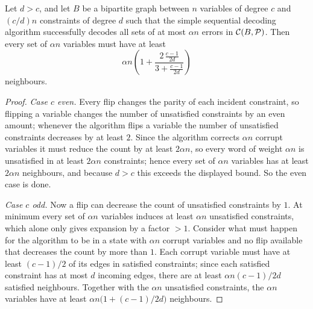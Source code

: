 \begin{theorem}
  \label{thm:necessity}
  Let $d>c$, and let $B$ be a bipartite graph between $n$ variables of degree
  $c$ and $(c/d)n$ constraints of degree $d$ such that the simple sequential
  decoding algorithm successfully decodes all sets of at most $\alpha n$ errors
  in $\mathcal{C}(B,\mathcal{P})$. Then every set of $\alpha n$ variables must have at least
  \[
    \alpha n\left(1 + \frac{2\,\frac{c-1}{2d}}{3+\frac{c-1}{2d}}\right)
  \]
  neighbours.
\end{theorem}
\begin{proof}
  \emph{Case $c$ even.} Every flip changes the parity of each incident
  constraint, so flipping a variable changes the number of unsatisfied
  constraints by an even amount; whenever the algorithm flips a variable the
  number of unsatisfied constraints decreases by at least $2$. Since the
  algorithm corrects $\alpha n$ corrupt variables it must reduce the count by at
  least $2\alpha n$, so every word of weight $\alpha n$ is unsatisfied in at
  least $2\alpha n$ constraints; hence every set of $\alpha n$ variables has at
  least $2\alpha n$ neighbours, and because $d>c$ this exceeds the displayed
  bound. So the even case is done.

  \emph{Case $c$ odd.} Now a flip can decrease the count of unsatisfied
  constraints by $1$. At minimum every set of $\alpha n$ variables induces at
  least $\alpha n$ unsatisfied constraints, which alone only gives expansion by a
  factor $>1$. Consider what must happen for the algorithm to be in a state with
  $\alpha n$ corrupt variables and no flip available that decreases the count by
  more than $1$. Each corrupt variable must have at least $(c-1)/2$ of its edges
  in satisfied constraints; since each satisfied constraint has at most $d$
  incoming edges, there are at least $\alpha n(c-1)/2d$ satisfied neighbours.
  Together with the $\alpha n$ unsatisfied constraints, the $\alpha n$ variables
  have at least $\alpha n\bigl(1+(c-1)/2d\bigr)$ neighbours.


\end{proof}
